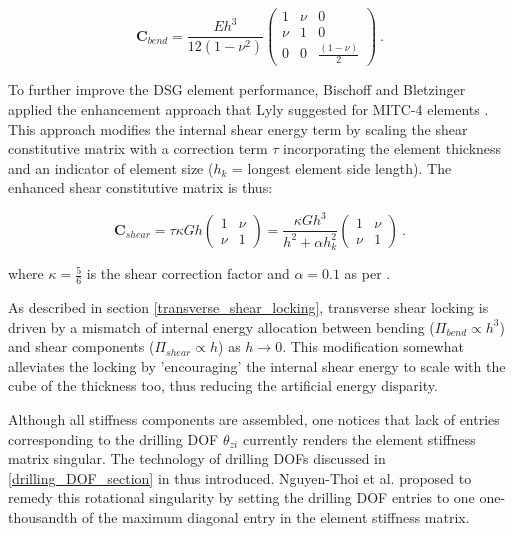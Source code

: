 \begin{equation} 
\mathbf{C}_{bend} =  \frac{E h^3}{12(1-\nu^2)}
\begin{pmatrix}
1 & \nu & 0 \\
\nu & 1 & 0 \\
0 & 0 & \frac{(1-\nu)}{2}
\end{pmatrix}
\label{eqt12}\ .
\end{equation}

To further improve the DSG element performance, Bischoff and Bletzinger \cite{Bis04} \cite{Bis01} applied the enhancement approach that Lyly suggested for MITC-4 elements \cite{Lyl93}. This approach modifies the internal shear energy term by scaling the shear constitutive matrix with a correction term $\tau$ incorporating the element thickness and an indicator of element size ($h_k$ = longest element side length). The enhanced  shear constitutive matrix is thus:

\begin{equation} 
\mathbf{C}_{shear} =  \tau \kappa Gh
\begin{pmatrix}
1 & \nu \\
\nu & 1 
\end{pmatrix}
=
\frac{\kappa G h^3}{h^2 + \alpha h_k^2}
\begin{pmatrix}
1 & \nu \\
\nu & 1 
\end{pmatrix}
\label{eqt14}\ .
\end{equation}

where $\kappa = \frac{5}{6}$ is the shear correction factor and $\alpha = 0.1$ as per \cite{Lyl93}.

As described in section \ref{transverse_shear_locking}, transverse shear locking is driven by a mismatch of internal energy allocation between bending ($\Pi_{bend} \propto h^3$) and shear components ($\Pi_{shear} \propto h$) as $h \rightarrow 0$.  This modification somewhat alleviates the locking by 'encouraging' the internal shear energy to scale with the cube of the thickness too, thus reducing the artificial energy disparity.

Although all stiffness components are assembled, one notices that lack of entries corresponding to the drilling DOF $\theta_{zi}$ currently renders the element stiffness matrix singular. The technology of drilling DOFs discussed in \ref{drilling_DOF_section} in thus introduced. Nguyen-Thoi et al. \cite{Ngu13} proposed to remedy this rotational singularity by setting the drilling DOF entries to one one-thousandth of the maximum diagonal entry in the element stiffness matrix.

